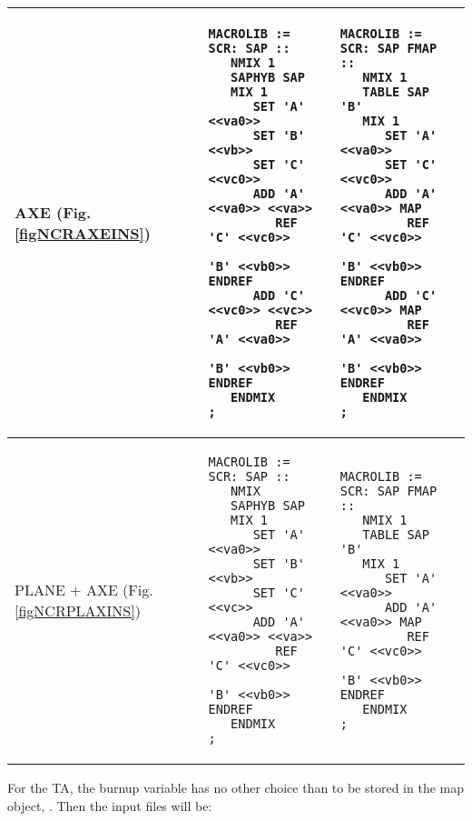 \begin{center}
\begin{supertabular}{|p{0.1\textwidth}|p{0.4\textwidth}|p{0.4\textwidth}|}
AXE (Fig. \ref{figNCRAXEINS}) & 
\begin{verbatim}
MACROLIB := SCR: SAP ::
   NMIX 1 
   SAPHYB SAP
   MIX 1 
      SET 'A' <<va0>>
      SET 'B' <<vb>>
      SET 'C' <<vc0>>
      ADD 'A' <<va0>> <<va>>
         REF  'C' <<vc0>> 
              'B' <<vb0>> ENDREF
      ADD 'C' <<vc0>> <<vc>>
         REF  'A' <<va0>> 
              'B' <<vb0>> ENDREF
   ENDMIX
;
\end{verbatim} &
\begin{verbatim}
MACROLIB := SCR: SAP FMAP ::
   NMIX 1
   TABLE SAP 'B' 
   MIX 1 
      SET 'A' <<va0>>
      SET 'C' <<vc0>>
      ADD 'A' <<va0>> MAP
         REF  'C' <<vc0>> 
              'B' <<vb0>> ENDREF
      ADD 'C' <<vc0>> MAP
         REF  'A' <<va0>> 
              'B' <<vb0>> ENDREF
   ENDMIX
;
\end{verbatim} \\
\hline
PLANE + AXE (Fig. \ref{figNCRPLAXINS}) & 
\begin{verbatim}
MACROLIB := SCR: SAP ::
   NMIX  
   SAPHYB SAP
   MIX 1 
      SET 'A' <<va0>>
      SET 'B' <<vb>>
      SET 'C' <<vc>>
      ADD 'A' <<va0>> <<va>>
         REF  'C' <<vc0>> 
              'B' <<vb0>> ENDREF
   ENDMIX
;
\end{verbatim} &
\begin{verbatim}
MACROLIB := SCR: SAP FMAP ::
   NMIX 1
   TABLE SAP 'B' 
   MIX 1 
      SET 'A' <<va0>>
      ADD 'A' <<va0>> MAP
         REF  'C' <<vc0>> 
              'B' <<vb0>> ENDREF
   ENDMIX
;
\end{verbatim} \\
\hline
\end{supertabular}
\end{center}

For the TA, the burnup variable has no other choice than to be stored in the {\sc map} object, . Then the input files will be: \\

